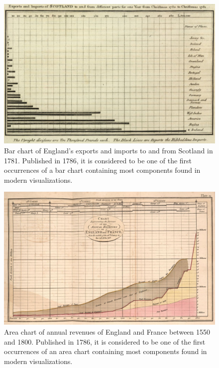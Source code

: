 \begin{figure}[tp]
\centering
\includegraphics[keepaspectratio,width=\linewidth,height=\thirdh]
{images/playfair-bar-chart.jpg}
\caption[Bar Chart by William Playfair from 1786]{%
Bar chart of England's exports and imports to and from Scotland in
1781. Published in 1786, it is considered to be one of the first
occurrences of a bar chart containing most components found in modern
visualizations. }
\label{fig:PlayfairBarChart}
\end{figure}



\begin{figure}[tp]
\centering
\includegraphics[keepaspectratio,width=\linewidth,height=\thirdh]
{images/playfair-area-chart.jpg}
\caption[Area Chart by William Playfair from 1786]{%
Area chart of annual revenues of England and France between 1550 and
1800. Published in 1786, it is considered to be one of the first
occurrences of an area chart containing most components found in
modern visualizations. }
\label{fig:PlayfairAreaChart}
\end{figure}




